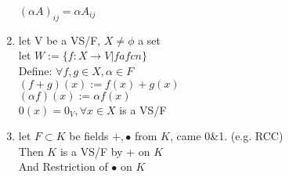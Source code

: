 \documentclass[11pt]{article}
\begin{document}
\begin{enumerate}
	$(\alpha A)_{ij}=\alpha A_{ij}$
	\item let V be a VS/F, $X\neq\phi$ a set\\
	let $W:=\{f:X\rightarrow V|f a fcn\}$\\
	Define: $\forall f,g\in X, \alpha \in F$\\
	$(f+g)(x):=f(x)+g(x)$\\
	$(\alpha f)(x):=\alpha f(x)$\\
	$0(x)=0_V, \forall x \in X$ is a VS/F
	\item let $F\subset K$ be fields $+, \bullet$ from $K$, came 0\&1. (e.g. RCC)\\
	Then $K$ is a VS/F by + on $K$\\
	And Restriction of $\bullet$ on $K$
\end{enumerate}
\end{document}
